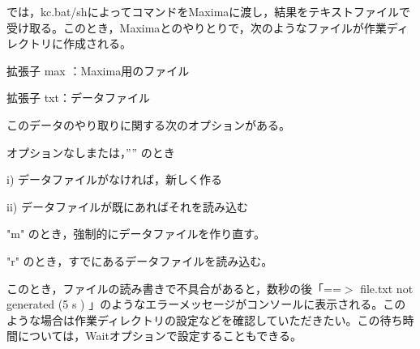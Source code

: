 \documentclass[papersize,a4paper,12pt,uplatex]{jsarticle}
\begin{document}
  \ketcindy では，kc.bat/shによってコマンドをMaximaに渡し，結果をテキストファイルで受け取る。このとき，Maximaとのやりとりで，次のようなファイルが作業ディレクトリに作成される。
  
拡張子 max ：Maxima用のファイル

拡張子 txt：データファイル

このデータのやり取りに関する次のオプションがある。

  オプションなしまたは，”” のとき
  
    i) データファイルがなければ，新しく作る
    
    ii) データファイルが既にあればそれを読み込む
    
  "m"  のとき，強制的にデータファイルを作り直す。
  
  "r" のとき，すでにあるデータファイルを読み込む。
  
  このとき，ファイルの読み書きで不具合があると，数秒の後「==$>$ file.txt not generated (5 s ) 」のようなエラーメッセージがコンソールに表示される。このような場合は作業ディレクトリの設定などを確認していただきたい。この待ち時間については，Waitオプションで設定することもできる。
  
\end{document}
